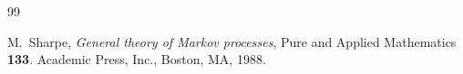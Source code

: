 \documentclass[12pt,a4paper]{article}
\newcommand{\1}{{\bf 1}}
\begin{document}
\begin{thebibliography}{99}
%
%
%

%



       {M.~Sharpe}, 
       \emph{General theory of Markov processes}, 
       Pure and Applied Mathematics {\bf 133}. 
       Academic Press, Inc., Boston, MA, 1988. 



%
%
%



\end{thebibliography}
\end{document}
